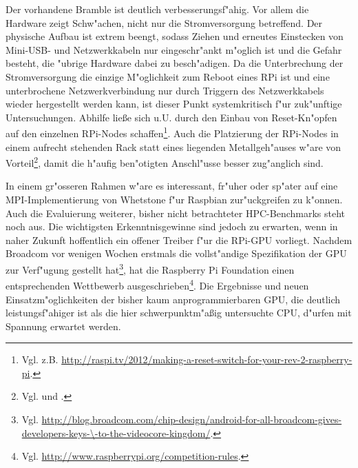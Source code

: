 Der vorhandene Bramble ist deutlich verbesserungsf"ahig. Vor allem die Hardware zeigt Schw"achen, nicht nur die Stromversorgung betreffend. Der physische Aufbau ist extrem beengt, sodass Ziehen und erneutes Einstecken von Mini-USB- und Netzwerkkabeln nur eingeschr"ankt m"oglich ist und die Gefahr besteht, die "ubrige Hardware dabei zu besch"adigen. Da die Unterbrechung der Stromversorgung die einzige M"oglichkeit zum Reboot eines RPi ist und eine unterbrochene Netzwerkverbindung nur durch Triggern des Netzwerkkabels wieder hergestellt werden kann, ist dieser Punkt systemkritisch f"ur zuk"unftige Untersuchungen. Abhilfe lie\ss e sich u.U. durch den Einbau von Reset-Kn"opfen auf den einzelnen RPi-Nodes schaffen\footnote{Vgl. z.B. \url{http://raspi.tv/2012/making-a-reset-switch-for-your-rev-2-raspberry-pi}.}. Auch die Platzierung der RPi-Nodes in einem aufrecht stehenden Rack statt eines liegenden Metallgeh"auses w"are von Vorteil\footnote{Vgl. \cite{kie01} und \cite{cox13}.}, damit die h"aufig ben"otigten Anschl"usse besser zug"anglich sind. 

In einem gr"osseren Rahmen w"are es interessant, fr"uher oder sp"ater auf eine MPI-Implemen\-tierung von Whetstone f"ur Raspbian zur"uckgreifen zu k"onnen. Auch die Evaluierung weiterer, bisher nicht betrachteter HPC-Benchmarks steht noch aus. Die wichtigsten Erkenntnisgewinne sind jedoch zu erwarten, wenn in naher Zukunft hoffentlich ein offener Treiber f"ur die RPi-GPU vorliegt. Nachdem Broadcom vor wenigen Wochen erstmals die vollst"andige Spezifikation der GPU zur Verf"ugung gestellt hat\footnote{Vgl. \url{http://blog.broadcom.com/chip-design/android-for-all-broadcom-gives-developers-keys-\-to-the-videocore-kingdom/}.}, hat die Raspberry Pi Foundation einen entsprechenden Wettbewerb ausgeschrieben\footnote{Vgl. \url{http://www.raspberrypi.org/competition-rules}.}. Die Ergebnisse und neuen Einsatzm"oglichkeiten der bisher kaum anprogrammierbaren GPU, die deutlich leistungsf"ahiger ist als die hier schwerpunktm"a\ss ig untersuchte CPU, d"urfen mit Spannung erwartet werden. 
\endinput